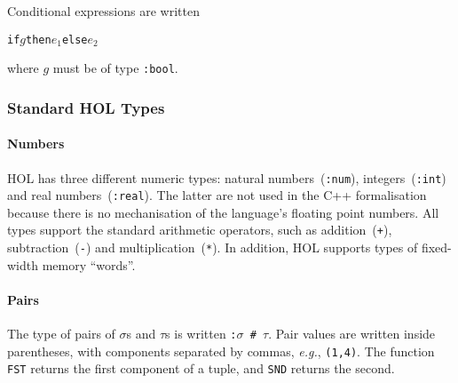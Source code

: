 \documentclass[11pt]{article}
\newcommand{\eg}{\emph{e.g.}}
\begin{document}
\vspace{1ex}
%
\noindent Conditional expressions are written
\begin{alltt}
   if \(g\) then \(e_1\) else \(e_2\)
\end{alltt}
where $g$ must be of type \texttt{:bool}.

\subsubsection{Standard HOL Types}
\label{sec:standard-hol-types}

\paragraph{Numbers} HOL has three different numeric types: natural
numbers~(\texttt{:num}), integers~(\texttt{:int}) and real
numbers~(\texttt{:real}).  The latter are not used in the C++
formalisation because there is no mechanisation of the language's
floating point numbers.  All types support the standard arithmetic
operators, such as addition~(\texttt{+}), subtraction~(\texttt{-}) and
multiplication~(\texttt{*}).  In addition, HOL supports types of
fixed-width memory ``words''.

\paragraph{Pairs} The type of pairs of $\sigma$s and $\tau$s is
written \texttt{:$\sigma$~\#~$\tau$}.  Pair values are written inside
parentheses, with components separated by commas, \eg, \texttt{(1,4)}.
 The function \texttt{FST} returns the first
component of a tuple, and \texttt{SND} returns
the second.
\end{document}
